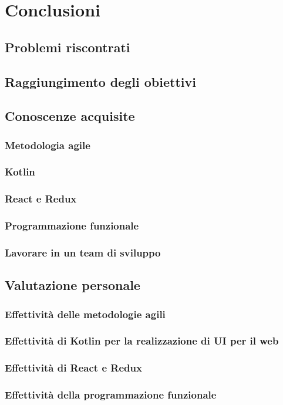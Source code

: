 
\chapter{Conclusioni}
\label{cap:conclusioni}

\section{Problemi riscontrati}

\section{Raggiungimento degli obiettivi}

\section{Conoscenze acquisite}
\subsection{Metodologia agile}
\subsection{Kotlin}
\subsection{React e Redux}
\subsection{Programmazione funzionale}
\subsection{Lavorare in un team di sviluppo}

\section{Valutazione personale}
\subsection{Effettività delle metodologie agili}
\subsection{Effettività di Kotlin per la realizzazione di UI per il web}
\subsection{Effettività di React e Redux}
\subsection{Effettività della programmazione funzionale}